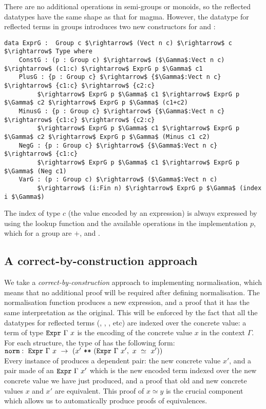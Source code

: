 There are no additional operations in semi-groups or monoids, so the reflected
datatypes have the same shape as that for magma.  However, the datatype for
reflected terms in groups introduces two new constructors for 
and :

\begin{lstlisting}
data ExprG :  Group c $\rightarrow$ (Vect n c) $\rightarrow$ c $\rightarrow$ Type where
    ConstG : (p : Group c) $\rightarrow$ ($\Gamma$:Vect n c) $\rightarrow$ (c1:c) $\rightarrow$ ExprG p $\Gamma$ c1
    PlusG : {p : Group c} $\rightarrow$ {$\Gamma$:Vect n c} $\rightarrow$ {c1:c} $\rightarrow$ {c2:c} 
         $\rightarrow$ ExprG p $\Gamma$ c1 $\rightarrow$ ExprG p $\Gamma$ c2 $\rightarrow$ ExprG p $\Gamma$ (c1+c2)
    MinusG : {p : Group c} $\rightarrow$ {$\Gamma$:Vect n c} $\rightarrow$ {c1:c} $\rightarrow$ {c2:c} 
         $\rightarrow$ ExprG p $\Gamma$ c1 $\rightarrow$ ExprG p $\Gamma$ c2 $\rightarrow$ ExprG p $\Gamma$ (Minus c1 c2)
    NegG : {p : Group c} $\rightarrow$ {$\Gamma$:Vect n c} $\rightarrow$ {c1:c} 
         $\rightarrow$ ExprG p $\Gamma$ c1 $\rightarrow$ ExprG p $\Gamma$ (Neg c1)
    VarG : (p : Group c) $\rightarrow$ ($\Gamma$:Vect n c) 
         $\rightarrow$ (i:Fin n) $\rightarrow$ ExprG p $\Gamma$ (index i $\Gamma$)
\end{lstlisting}


The index of type $c$ (the value encoded by an expression) is always expressed
by using the lookup function  and the available operations in the
implementation $p$, which for a group are $+$,  and .

\subsection{A correct-by-construction approach}
\label{sect:correctByConstruction}

We take a \emph{correct-by-construction} approach to implementing
normalisation, which means that no additional proof will be required after
defining normalisation.
The normalisation function  produces a new expression,
and a proof that it
has the same interpretation as the original.
This will be enforced by the fact that all the datatypes for
reflected terms (, , , etc) are indexed
over the concrete value: a term of type ${\mbox{\texttt{Expr}}}\ \Gamma\ x$ is
the encoding of the concrete value $x$ in the context $\Gamma$.  For each
structure, the type of  has
the following form:
\\ $\code{norm} :\ \code{Expr}\ \Gamma\ x\ \rightarrow\ (x'\ \code{**}\
(\code{Expr}\ \Gamma\ x',\ x\ \simeq\ x'))$ \\ 
Every instance of
 produces a dependent pair: the new concrete value $x'$, and a
pair made of an $\code{Expr}\ \Gamma\ x'$ which is the new encoded term indexed
over the new concrete value we have just produced, and a proof that old and new
concrete values $x$ and $x'$ are equivalent.
This proof of $x \simeq y$ is the crucial component which allows us to
automatically produce proofs of equivalences.

